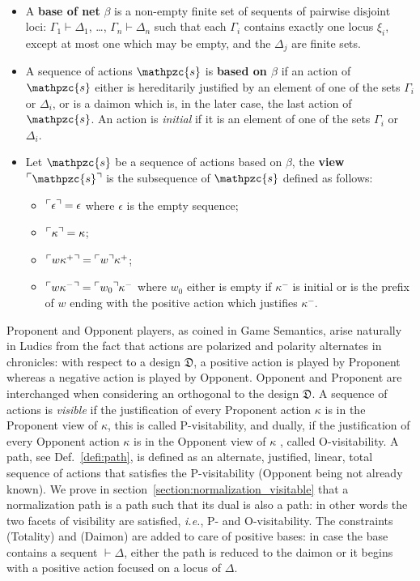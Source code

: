 \documentclass{LMCS}
\def\ie{{\em i.e.}}
\newcommand{\design}[1]{{\mathfrak{#1}}}
\newcommand{\pathLL}[1]{\mathpzc{#1}}\newcommand{\strategy}[1]{\pathLL{#1}}\newcommand{\view}[1]{\raisebox{.3ex}{$\ulcorner$}{#1}\raisebox{.3ex}{$\urcorner$}}\newcommand{\fullview}[1]{\raisebox{.3ex}{$\ulcorner\mkern-6mu\ulcorner\mkern-2mu$}{#1}\raisebox{.3ex}{$\mkern-2mu\urcorner\mkern-6mu\urcorner$}}\newcommand{\views}[1]{\view{#1}}\newcommand{\fullviews}[1]{\fullview{#1}}\newcommand{\shuffle}[1]{\llcorner\design{#1}\lrcorner}\newcommand{\PoD}[1]{{\mathcal{P}}_{#1}}\newcommand{\norm}[1]{\llbracket\design{#1}\rrbracket}
\begin{document}
\begin{defi}~
\begin{itemize}
\item A {\bf base of net} $\beta$ is a non-empty finite set of sequents of pairwise disjoint loci: $\Gamma_1\vdash\Delta_1$, \dots,
$\Gamma_n\vdash\Delta_n$ such that each $\Gamma_i$ contains exactly one locus $\xi_i$, except at most one which may be empty, and the $\Delta_j$ are finite sets.
\item A sequence of actions $\pathLL{s}$ is {\bf based on $\beta$} if an action of $\pathLL{s}$ either is hereditarily justified by an element of one of the sets $\Gamma_i$ or $\Delta_i$, or is a daimon which is, in the later case, the last action of $\pathLL{s}$. 
An action is {\em initial} if it is an element of one of the sets $\Gamma_i$ or $\Delta_i$.
\item Let $\pathLL{s}$ be a sequence of actions based on $\beta$, the {\bf view} $\view{\pathLL{s}}$ is the subsequence of $\pathLL{s}$
defined as follows:
\begin{itemize}[label=$-$]
\item $\view{\epsilon}=\epsilon$ where $\epsilon$ is the empty sequence;
\item $\view{\kappa}=\kappa$;
\item $\view{w\kappa^+}=\view{w}\kappa^+$;
\item $\view{w\kappa^-}=\view{w_0}\kappa^-$ where $w_0$ either is empty if $\kappa^-$ is initial or is the prefix of $w$ ending with the positive action which justifies $\kappa^-$.
\end{itemize}
\end{itemize}
\end{defi}

\noindent Proponent and Opponent players, as coined in Game Semantics, arise naturally in Ludics from the fact that actions are polarized and polarity alternates in chronicles: with respect to a design $\design{D}$, a positive action is played by Proponent whereas a negative action is played by Opponent. Opponent and Proponent are interchanged when considering an orthogonal to the design $\design{D}$. 
A sequence of actions is {\em visible} if the justification of every Proponent action $\kappa$ is in the Proponent view of $\kappa$, this is called P-visitability, and dually, if the justification of every Opponent action $\kappa$ is in the Opponent view of $\kappa$ , called O-visitability. 
 A path, see Def.~\ref{defi:path}, is defined as an alternate, justified, linear, total sequence of actions that satisfies the P-visitability (Opponent being not already known).
We prove in section~\ref{section:normalization_visitable} that a normalization path is a path such that its dual is also a path: in other words the two facets of visibility are satisfied, \ie, P- and O-visitability.
The constraints (Totality) and (Daimon) are added to care of positive bases: in case the base contains a sequent $\vdash \Delta$, either the path is reduced to the daimon or it begins with a positive action focused on a locus of $\Delta$.
\end{document}
